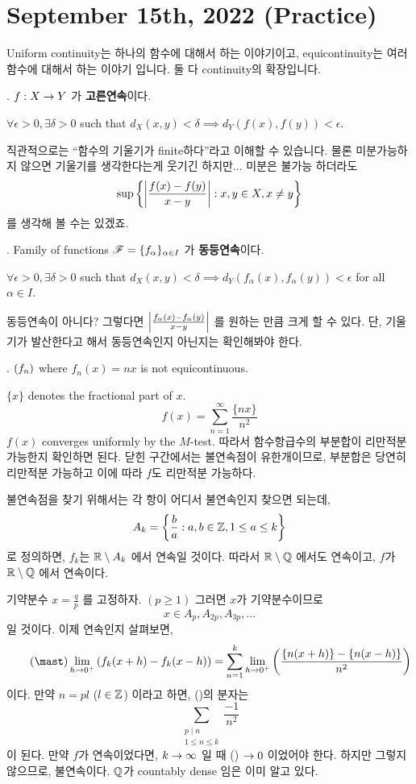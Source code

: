 \section*{September 15th, 2022 (Practice)}

Uniform continuity는 하나의 함수에 대해서 하는 이야기이고, equicontinuity는 여러 함수에 대해서 하는 이야기 입니다. 둘 다 continuity의 확장입니다.

.  \(f: X \rightarrow Y\) 가 \textbf{고른연속}이다. \miff
\begin{center}
    \(\forall \epsilon > 0, \exists \delta > 0\) such that \(d_X(x, y) < \delta \implies d_Y(f(x), f(y)) < \epsilon\).
\end{center}

직관적으로는 ``함수의 기울기가 finite하다''라고 이해할 수 있습니다. 물론 미분가능하지 않으면 기울기를 생각한다는게 웃기긴 하지만... 미분은 불가능 하더라도
\[
    \sup\left\{\left| \frac{f(x) - f(y)}{x - y} \right| : x, y \in X, x\neq y\right\}
\]
를 생각해 볼 수는 있겠죠.

.  Family of functions \(\mathscr{F} = \{f_\alpha\}_{\alpha \in I}\) 가 \textbf{동등연속}이다. \miff
\begin{center}
    \(\forall \epsilon > 0, \exists \delta > 0\) such that \(d_X(x, y) < \delta \implies d_Y(f_\alpha(x), f_\alpha(y)) < \epsilon\) for all \(\alpha \in I\).
\end{center}

동등연속이 아니다? 그렇다면 \(\left| \frac{f_\alpha(x) - f_\alpha(y)}{x - y} \right|\) 를 원하는 만큼 크게 할 수 있다. 단, 기울기가 발산한다고 해서 동등연속인지 아닌지는 확인해봐야 한다.

\ex. \(\left( f_n \right)\) where \(f_n(x) = nx\) is not equicontinuous.

 \(\{x\}\) denotes the fractional part of \(x\).
\[
    f(x) = \sum_{n=1}^\infty \frac{\{nx\}}{n^2}
\]
\(f(x)\) converges uniformly by the \(M\)-test. 따라서 함수항급수의 부분합이 리만적분 가능한지 확인하면 된다. 닫힌 구간에서는 불연속점이 유한개이므로, 부분합은 당연히 리만적분 가능하고 이에 따라 \(f\)도 리만적분 가능하다.

불연속점을 찾기 위해서는 각 항이 어디서 불연속인지 찾으면 되는데,
\[
    A_k = \left\{\frac{b}{a} : a, b \in \mathbb{Z}, 1 \leq a \leq k\right\}
\]
로 정의하면, \(f_k\)는 \(\mathbb{R} \setminus A_k\) 에서 연속일 것이다. 따라서 \(\mathbb{R} \setminus \mathbb{Q}\) 에서도 연속이고, \(f\)가 \(\mathbb{R} \setminus \mathbb{Q}\) 에서 연속이다.

기약분수 \(x = \frac{q}{p}\) 를 고정하자. \((p \geq 1)\) 그러면 \(x\)가 기약분수이므로
\[
    x \in A_p, A_{2p}, A_{3p}, \dots
\]
일 것이다. 이제 연속인지 살펴보면,
\[ \tag{\mast}
    \lim_{h \ra 0^+} \left(f_k(x + h) - f_k(x - h)\right) = \sum_{n=1}^k \lim_{h \ra 0^+} \left(\frac{\{n(x + h)\} - \{n(x - h)\}}{n^2}\right)
\]
이다. 만약 \(n = pl\) (\(l \in \mathbb{Z}\)) 이라고 하면, (\mast)의 분자는
\[
    \sum_{\substack{p \mid n \\ 1\leq n\leq k}} \frac{-1}{n^2}
\]
이 된다. 만약 \(f\)가 연속이었다면, \(k \rightarrow\infty\) 일 때 (\mast) \(\rightarrow 0\) 이었어야 한다. 하지만 그렇지 않으므로, 불연속이다. \(\mathbb{Q}\)가 countably dense 임은 이미 알고 있다.

